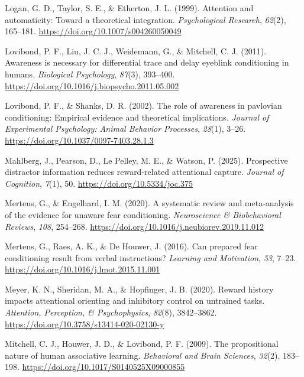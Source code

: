 \documentclass[
  jou,
  floatsintext,
  longtable,
  nolmodern,
  notxfonts,
  notimes,
  colorlinks=true,linkcolor=blue,citecolor=blue,urlcolor=blue]{apa7}
\newlength{\cslhangindent}
\newenvironment{CSLReferences}[2] %
 {\begin{list}{}{%
  \setlength{\itemindent}{0pt}
  \setlength{\leftmargin}{0pt}
  \setlength{\parsep}{0pt}
  \ifodd #1
   \setlength{\leftmargin}{\cslhangindent}
   \setlength{\itemindent}{-1\cslhangindent}
  \fi
  \setlength{\itemsep}{#2\baselineskip}}}
 {\end{list}}
\begin{document}
\begin{CSLReferences}{1}{0}
Logan, G. D., Taylor, S. E., \& Etherton, J. L. (1999). Attention and
automaticity: Toward a theoretical integration. \emph{Psychological
Research}, \emph{62}(2), 165--181.
\url{https://doi.org/10.1007/s004260050049}

Lovibond, P. F., Liu, J. C. J., Weidemann, G., \& Mitchell, C. J.
(2011). Awareness is necessary for differential trace and delay eyeblink
conditioning in humans. \emph{Biological Psychology}, \emph{87}(3),
393--400. \url{https://doi.org/10.1016/j.biopsycho.2011.05.002}

Lovibond, P. F., \& Shanks, D. R. (2002). The role of awareness in
pavlovian conditioning: Empirical evidence and theoretical implications.
\emph{Journal of Experimental Psychology: Animal Behavior Processes},
\emph{28}(1), 3--26. \url{https://doi.org/10.1037/0097-7403.28.1.3}

Mahlberg, J., Pearson, D., Le Pelley, M. E., \& Watson, P. (2025).
Prospective distractor information reduces reward-related attentional
capture. \emph{Journal of Cognition}, \emph{7}(1), 50.
\url{https://doi.org/10.5334/joc.375}

Mertens, G., \& Engelhard, I. M. (2020). A systematic review and
meta-analysis of the evidence for unaware fear conditioning.
\emph{Neuroscience \& Biobehavioral Reviews}, \emph{108}, 254--268.
\url{https://doi.org/10.1016/j.neubiorev.2019.11.012}

Mertens, G., Raes, A. K., \& De Houwer, J. (2016). Can prepared fear
conditioning result from verbal instructions? \emph{Learning and
Motivation}, \emph{53}, 7--23.
\url{https://doi.org/10.1016/j.lmot.2015.11.001}

Meyer, K. N., Sheridan, M. A., \& Hopfinger, J. B. (2020). Reward
history impacts attentional orienting and inhibitory control on
untrained tasks. \emph{Attention, Perception, \& Psychophysics},
\emph{82}(8), 3842--3862.
\url{https://doi.org/10.3758/s13414-020-02130-y}

Mitchell, C. J., Houwer, J. D., \& Lovibond, P. F. (2009). The
propositional nature of human associative learning. \emph{Behavioral and
Brain Sciences}, \emph{32}(2), 183--198.
\url{https://doi.org/10.1017/S0140525X09000855}


\end{CSLReferences}
\end{document}
